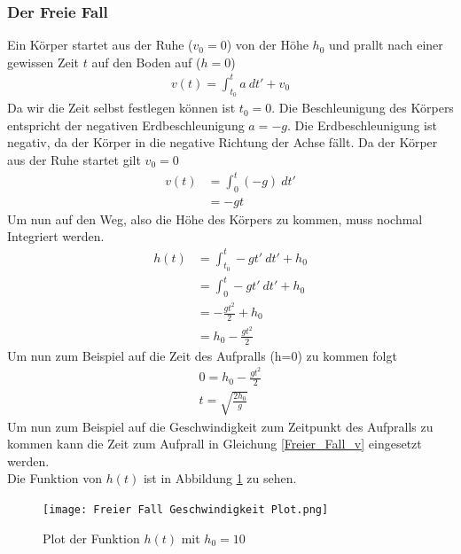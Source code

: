 \documentclass{article}
\begin{document}
\subsubsection{Der Freie Fall}
Ein Körper startet aus der Ruhe ($v_0=0$) von der Höhe $h_0$ und prallt nach einer gewissen Zeit $t$ auf den Boden auf ($h=0$)
\begin{align}
    v(t)=\int_{t_0}^{t}a\ dt'+v_0
\end{align}
Da wir die Zeit selbst festlegen können ist $t_0=0$. Die Beschleunigung des Körpers entspricht der negativen Erdbeschleunigung $a=-g$.
Die Erdbeschleunigung ist negativ, da der Körper in die negative Richtung der Achse fällt. Da der Körper aus der Ruhe startet gilt $v_0=0$
\begin{align}
    v(t)&=\int_{0}^{t}(-g)\ dt'\\
    &=-gt \label{Freier_Fall_v}
\end{align}
Um nun auf den Weg, also die Höhe des Körpers zu kommen, muss nochmal Integriert werden.
\begin{align}
    h(t)&=\int_{t_0}^{t}-gt'\ dt'+h_0\\
    &=\int_{0}^{t}-gt'\ dt' + h_0\\
    &=-\frac{gt^2}{2}+h_0\\
    &=h_0-\frac{gt^2}{2}
\end{align}
Um nun zum Beispiel auf die Zeit des Aufpralls (h=0) zu kommen folgt
\begin{align}
    0=h_0-\frac{gt^2}{2}\\
    t=\sqrt{\frac{2h_0}{g}}
\end{align}
Um nun zum Beispiel auf die Geschwindigkeit zum Zeitpunkt des Aufpralls zu kommen kann die Zeit zum Aufprall in Gleichung \ref{Freier_Fall_v} eingesetzt werden.\\
Die Funktion von $h(t)$ ist in Abbildung \ref{fig:Freier Fall h(t)} zu sehen.
\begin{figure}[H]  %
    \centering      %
    \texttt{[image: Freier Fall Geschwindigkeit Plot.png]} %
    \caption{Plot der Funktion $h(t)$ mit $h_0=10$} %
    \label{fig:Freier Fall h(t)} %
\end{figure}
\end{document}

